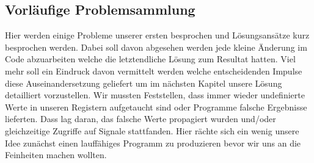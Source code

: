 \documentclass[paper=a4,fontsize=12pt,twocolumn]{scrreprt}
\begin{document}
\subsection{Vorläufige Problemsammlung}



Hier werden einige Probleme unserer ersten besprochen und Lösungsansätze kurz besprochen werden. Dabei soll davon abgesehen werden jede kleine Änderung im Code abzuarbeiten welche die letztendliche Lösung zum Resultat hatten. Viel mehr soll ein Eindruck davon vermittelt werden welche entscheidenden Impulse diese Auseinandersetzung geliefert um im nächsten Kapitel unsere Lösung detailliert vorzustellen.
Wir mussten Feststellen, dass immer wieder undefinierte Werte in unseren Registern aufgetaucht sind oder Programme falsche Ergebnisse lieferten.
Dass lag daran, das falsche Werte propagiert wurden und/oder gleichzeitige Zugriffe auf Signale stattfanden.
Hier rächte sich ein wenig unsere Idee zunächst einen lauffähiges Programm zu produzieren bevor wir uns an die Feinheiten machen wollten.
\end{document}
